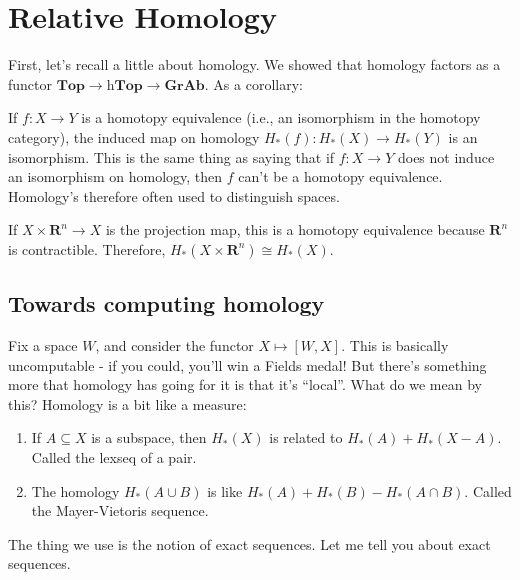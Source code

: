 \section{Relative Homology}
First, let's recall a little about homology. We showed that homology factors as a functor $\mathbf{Top}\to\mathrm{h}\mathbf{Top}\to\mathbf{GrAb}$. As a corollary:
\begin{corollary}
If $f:X\to Y$ is a homotopy equivalence (i.e., an isomorphism in the homotopy category), the induced map on homology $ H_\ast(f): H_\ast(X)\to H_\ast(Y)$ is an isomorphism. This is the same thing as saying that if $f:X\to Y$ does not induce an isomorphism on homology, then $f$ can't be a homotopy equivalence. Homology's therefore often used to distinguish spaces.
\end{corollary}
\begin{example}
If $X\times\mathbf{R}^n\to X$ is the projection map, this is a homotopy equivalence because $\mathbf{R}^n$ is contractible. Therefore, $ H_\ast(X\times\mathbf{R}^n)\cong H_\ast(X)$.
\end{example}
\subsection{Towards computing homology}
Fix a space $W$, and consider the functor $X\mapsto [W,X]$. This is basically uncomputable - if you could, you'll win a Fields medal! But there's something more that homology has going for it is that it's ``local''. What do we mean by this? Homology is a bit like a measure:
	\begin{enumerate}
	\item If $A\subseteq X$ is a subspace, then $ H_\ast(X)$ is related to $ H_\ast(A)+ H_\ast(X-A)$. Called the lexseq of a pair.
	\item The homology $ H_\ast(A\cup B)$ is like $ H_\ast(A)+ H_\ast(B)- H_\ast(A\cap B)$. Called the Mayer-Vietoris sequence.
	\end{enumerate}
The thing we use is the notion of exact sequences. Let me tell you about exact sequences.
